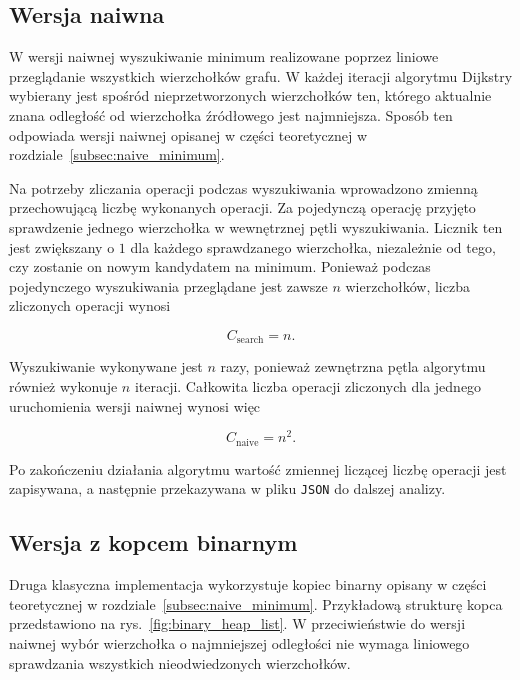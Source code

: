 \subsection{Wersja naiwna}
\label{subsec:naive_implementation}

W wersji naiwnej wyszukiwanie minimum realizowane poprzez liniowe przeglądanie wszystkich wierzchołków grafu. W każdej iteracji algorytmu Dijkstry wybierany jest spośród nieprzetworzonych wierzchołków ten, którego aktualnie znana odległość od wierzchołka źródłowego jest najmniejsza. Sposób ten odpowiada wersji naiwnej opisanej w części teoretycznej w rozdziale~\ref{subsec:naive_minimum}.

Na potrzeby zliczania operacji podczas wyszukiwania wprowadzono zmienną przechowującą liczbę wykonanych operacji. Za pojedynczą operację przyjęto sprawdzenie jednego wierzchołka w wewnętrznej pętli wyszukiwania. Licznik ten jest zwiększany o $1$ dla każdego sprawdzanego wierzchołka, niezależnie od tego, czy zostanie on nowym kandydatem na minimum. Ponieważ podczas pojedynczego wyszukiwania przeglądane jest zawsze $n$ wierzchołków, liczba zliczonych operacji wynosi

\begin{equation}
    C_{\mathrm{search}} = n.
\end{equation}

\newpage

Wyszukiwanie wykonywane jest $n$ razy, ponieważ zewnętrzna pętla algorytmu również wykonuje $n$ iteracji. Całkowita liczba operacji zliczonych dla jednego uruchomienia wersji naiwnej wynosi więc

\begin{equation}
    C_{\mathrm{naive}}
    =
    n^2.
\end{equation}

Po zakończeniu działania algorytmu wartość zmiennej liczącej liczbę operacji jest zapisywana, a następnie przekazywana w pliku \texttt{JSON} do dalszej analizy.

\subsection{Wersja z kopcem binarnym}
\label{subsec:binary_implementation}

Druga klasyczna implementacja wykorzystuje kopiec binarny opisany w części teoretycznej w rozdziale~\ref{subsec:naive_minimum}. Przykładową strukturę kopca przedstawiono na rys.~\ref{fig:binary_heap_list}. W przeciwieństwie do wersji naiwnej wybór wierzchołka o najmniejszej odległości nie wymaga liniowego sprawdzania wszystkich nieodwiedzonych wierzchołków.

